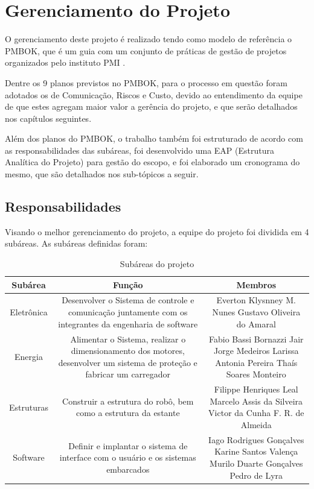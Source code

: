 \chapter[Gerenciamento do Projeto] {Gerenciamento do Projeto}

O gerenciamento deste projeto é realizado tendo como modelo de referência o PMBOK, que é um guia com um conjunto de práticas de gestão de projetos organizados pelo instituto PMI \cite{pmbok2004}.

Dentre os 9 planos previstos no PMBOK, para o processo em questão foram adotados os de Comunicação, Riscos e Custo, devido ao entendimento da equipe de que estes agregam maior valor a gerência do projeto, e que serão detalhados nos capítulos seguintes.

Além dos planos do PMBOK, o trabalho também foi estruturado de acordo com as responsabilidades das subáreas, foi desenvolvido uma EAP (Estrutura Analítica do Projeto) para gestão do escopo, e foi elaborado um cronograma do mesmo, que são detalhados nos sub-tópicos a seguir.

\section{Responsabilidades}
Visando o melhor gerenciamento do projeto, a equipe do projeto foi dividida em 4 subáreas. As subáreas definidas foram:
\begin{table}[h]
\caption{Subáreas do projeto}
\centering
\begin{tabular}{|c|c|c|} \hline
\textbf{Subárea} & \textbf{Função} & \textbf{Membros}\\ \hline                               
Eletrônica & Desenvolver o Sistema de controle e comunicação juntamente com os integrantes da engenharia de software & Everton Klysnney M. Nunes Gustavo Oliveira do Amaral\\ \hline
Energia & Alimentar o Sistema, realizar o dimensionamento dos motores, desenvolver um sistema de proteção e fabricar um carregador & Fabio Bassi Bornazzi Jair Jorge Medeiros Larissa Antonia Pereira Thaís Soares Monteiro\\ \hline
Estruturas & Construir a estrutura do robô, bem como a estrutura da estante & Filippe Henriques Leal Marcelo Assis da Silveira Victor da Cunha F. R. de Almeida\\ \hline
Software & Definir e implantar o sistema de interface com o usuário e os sistemas embarcados & Iago Rodrigues Gonçalves Karine Santos Valença Murilo Duarte Gonçalves
Pedro de Lyra\\ \hline
\end{tabular}
\end{table}

